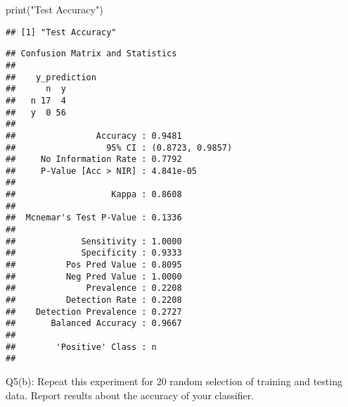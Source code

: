 \documentclass[
]{article}
\newenvironment{Shaded}{\begin{snugshade}}{\end{snugshade}}
\newcommand{\FunctionTok}[1]{\textcolor[rgb]{0.00,0.00,0.00}{#1}}
\newcommand{\NormalTok}[1]{#1}
\newcommand{\OtherTok}[1]{\textcolor[rgb]{0.56,0.35,0.01}{#1}}
\newcommand{\SpecialCharTok}[1]{\textcolor[rgb]{0.00,0.00,0.00}{#1}}
\newcommand{\StringTok}[1]{\textcolor[rgb]{0.31,0.60,0.02}{#1}}
\begin{document}
\begin{Shaded}
\begin{Highlighting}[]
\FunctionTok{print}\NormalTok{(}\StringTok{"Test Accuracy"}\NormalTok{)}
\end{Highlighting}
\end{Shaded}

\begin{verbatim}
## [1] "Test Accuracy"
\end{verbatim}

\begin{Shaded}
\end{Shaded}

\begin{verbatim}
## Confusion Matrix and Statistics
## 
##    y_prediction
##      n  y
##   n 17  4
##   y  0 56
##                                           
##                Accuracy : 0.9481          
##                  95% CI : (0.8723, 0.9857)
##     No Information Rate : 0.7792          
##     P-Value [Acc > NIR] : 4.841e-05       
##                                           
##                   Kappa : 0.8608          
##                                           
##  Mcnemar's Test P-Value : 0.1336          
##                                           
##             Sensitivity : 1.0000          
##             Specificity : 0.9333          
##          Pos Pred Value : 0.8095          
##          Neg Pred Value : 1.0000          
##              Prevalence : 0.2208          
##          Detection Rate : 0.2208          
##    Detection Prevalence : 0.2727          
##       Balanced Accuracy : 0.9667          
##                                           
##        'Positive' Class : n               
## 
\end{verbatim}

Q5(b): Repeat this experiment for 20 random selection of training and
testing data. Report results about the accuracy of your classifier.
\end{document}
